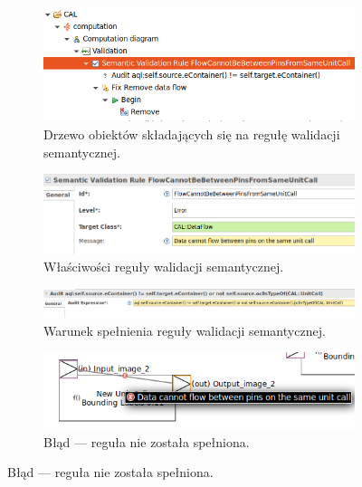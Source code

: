 \begin{figure}
	\centering
	\begin{subfigure}{.8\textwidth}
		\centering
		\includegraphics[width=.99\linewidth]{./images/sirius-desktop-example-semantic-validation-rule-tree.png}
		\caption{Drzewo obiektów składających się na regułę walidacji
      semantycznej.}\label{rys:sirius-desktop-example-semantic-validation-rule-tree}
	\end{subfigure}

  \medskip

	\begin{subfigure}{.92\textwidth}
		\centering
		\includegraphics[width=.99\linewidth]{./images/sirius-desktop-example-semantic-validation-rule-properties.png}
		\caption{Właściwości reguły walidacji semantycznej.}\label{rys:sirius-desktop-example-semantic-validation-rule-properties}
	\end{subfigure}

  \medskip

	\begin{subfigure}{.92\textwidth}
		\centering
		\includegraphics[width=.99\linewidth]{./images/sirius-desktop-example-semantic-validation-rule-audit.png}
		\caption{Warunek spełnienia reguły walidacji semantycznej.}\label{rys:sirius-desktop-example-semantic-validation-rule-audit}
	\end{subfigure}

  \begin{subfigure}{.92\textwidth}
    \centering
    \includegraphics[width=.99\linewidth]{./images/sirius-desktop-example-semantic-validation-rule-failure.png}
    \caption{Błąd --- reguła nie została
    spełniona.}\label{rys:sirius-desktop-example-semantic-validation-rule-failure}
  \end{subfigure}


\end{figure}
